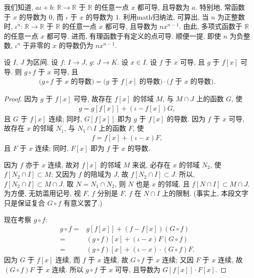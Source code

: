 \begin{example}
    我们知道,
    $a\iota + b$: $\mathbb{R} \to \mathbb{R}$
    于 $\mathbb{R}$ 的任意一点 $x$ 都可导, 且导数为 $a$.
    特别地,
    常函数于 $x$ 的导数为 $0$,
    而 $\iota$ 于 $x$ 的导数为 $1$.
    利用\gls{math}归纳法, 可算出,
    当 $n$ 为正整数时,
    $\iota^n$: $\mathbb{R} \to \mathbb{R}$
    于 $\mathbb{R}$ 的任意一点 $x$ 都可导,
    且导数为 $nx^{n-1}$.
    由此, 多项式函数于 $\mathbb{R}$ 的任意一点 $x$ 都可导.
    进而, 有理函数于有定义的点可导.
    顺便一提, 即使 $n$ 为负整数,
    $\iota^n$ 于非零的 $x$ 的导数仍为 $nx^{n-1}$.
\end{example}


\begin{theorem}[链规则]
    设 $I$, $J$ 为区间.
    设 $f$: $I \to J$, $g$: $J \to K$.
    设 $x \in I$.
    设 $f$ 于 $x$ 可导, 且 $g$ 于 $f[x]$ 可导.
    则 $g \circ f$ 于 $x$ 可导, 且
    \begin{align*}
        \text{($g \circ f$ 于 $x$ 的导数)} = \text{($g$ 于 $f[x]$ 的导数)} \cdot \text{($f$ 于 $x$ 的导数)}.
    \end{align*}
\end{theorem}

\begin{proof}
    因为 $g$ 于 $f[x]$ 可导,
    故存在 $f[x]$ 的邻域 $M$, 与 $M \cap J$ 上的函数 $G$,
    使
    \begin{align*}
        g = g[f[x]] + (\iota - f[x])G,
    \end{align*}
    且 $G$ 于 $f[x]$ 连续;
    同时, $G[f[x]]$ 即为 $g$ 于 $f[x]$ 的导数.
    因为 $f$ 于 $x$ 可导,
    故存在 $x$ 的邻域 $N_1$, 与 $N_1 \cap I$ 上的函数 $F$,
    使
    \begin{align*}
        f = f[x] + (\iota - x)F,
    \end{align*}
    且 $F$ 于 $x$ 连续;
    同时, $F[x]$ 即为 $f$ 于 $x$ 的导数.

    因为 $f$ 亦于 $x$ 连续,
    故对 $f[x]$ 的邻域 $M$ 来说,
    必存在 $x$ 的邻域 $N_2$, 使 $f[N_2 \cap I] \subset M$;
    又因为 $f$ 的陪域为 $J$,
    故 $f[N_2 \cap I] \subset J$.
    所以, $f[N_2 \cap I] \subset M \cap J$.
    取 $N = N_1 \cap N_2$, 则 $N$ 也是 $x$ 的邻域,
    且 $f[N \cap I] \subset M \cap J$.
    为方便, 无妨滥用记号,
    视 $F$, $f$ 分别是 $F$, $f$ 在 $N \cap I$ 上的限制.
    (事实上, 本段文字只是保证复合 $G \circ f$ 有意义罢了.)

    现在考察 $g \circ f$:
    \begin{align*}
        g \circ f
        = {} & g[f[x]] + (f - f[x])(G \circ f)                  \\
        = {} & (g \circ f)[x] + (\iota - x)F(G \circ f)         \\
        = {} & (g \circ f)[x] + (\iota - x) \cdot (G \circ f)F.
    \end{align*}
    因为 $G$ 于 $f[x]$ 连续, 而 $f$ 于 $x$ 连续,
    故 $G \circ f$ 于 $x$ 连续;
    又因 $F$ 于 $x$ 连续,
    故 $(G \circ f)F$ 于 $x$ 连续.
    所以 $g \circ f$ 于 $x$ 可导,
    且导数为 $G[f[x]] \cdot F[x]$.
\end{proof}

